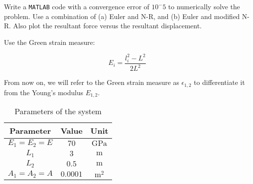 Write a \texttt{MATLAB} code with a convergence error of $10^-5$ to numerically solve the problem.
Use a combination of (a) Euler and N-R, and (b) Euler and modified N-R.
Also plot the resultant force versus the resultant displacement.

Use the Green strain measure:

\begin{equation}
    E_i = \frac{l_i^2 - L^2}{2L^2}
    \label{eq:green_strain_measure_formula}
\end{equation}

From now on, we will refer to the Green strain measure as $\epsilon_{1,2}$ to differentiate it from the Young's modulus $E_{1,2}$.

\begin{table}[H]
    \centering
    \begin{tabular}{|c|c|c|}
        \hline
        \textbf{Parameter} & \textbf{Value} & \textbf{Unit} \\ \hline
        $E_1 = E_2 = E$    & $70$           & $\text{GPa}$  \\ \hline
        $L_1$              & $3$            & $\text{m}$    \\ \hline
        $L_2$              & $0.5$          & $\text{m}$    \\ \hline
        $A_1 = A_2 = A$    & $0.0001$       & $\text{m}^2$  \\ \hline
    \end{tabular}
    \caption{Parameters of the system}
    \label{tab:parameters_of_the_system}
\end{table}
